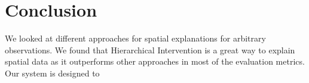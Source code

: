 \chapter{Conclusion}
We looked at different approaches for spatial explanations for arbitrary observations. We found that Hierarchical Intervention is a great way to explain spatial data as it outperforms other approaches in most of the evaluation metrics. Our system is designed to 